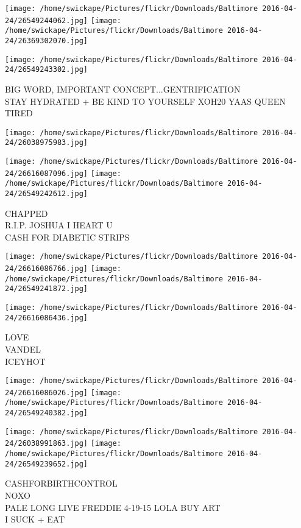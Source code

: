\documentclass[10pt,letterpaper]{article}
\begin{document}
\texttt{[image: /home/swickape/Pictures/flickr/Downloads/Baltimore 2016-04-24/26549244062.jpg]}
\texttt{[image: /home/swickape/Pictures/flickr/Downloads/Baltimore 2016-04-24/26369302070.jpg]}

\vspace{0.25in}
\texttt{[image: /home/swickape/Pictures/flickr/Downloads/Baltimore 2016-04-24/26549243302.jpg]}

BIG WORD, IMPORTANT CONCEPT...GENTRIFICATION\\
STAY HYDRATED + BE KIND TO YOURSELF XOH20 YAAS QUEEN\\
TIRED
\pagebreak

\texttt{[image: /home/swickape/Pictures/flickr/Downloads/Baltimore 2016-04-24/26038975983.jpg]}

\vspace{0.25in}
\texttt{[image: /home/swickape/Pictures/flickr/Downloads/Baltimore 2016-04-24/26616087096.jpg]}
\texttt{[image: /home/swickape/Pictures/flickr/Downloads/Baltimore 2016-04-24/26549242612.jpg]}

CHAPPED\\
R.I.P. JOSHUA I HEART U\\
CASH FOR DIABETIC STRIPS
\pagebreak

\texttt{[image: /home/swickape/Pictures/flickr/Downloads/Baltimore 2016-04-24/26616086766.jpg]}
\texttt{[image: /home/swickape/Pictures/flickr/Downloads/Baltimore 2016-04-24/26549241872.jpg]}

\vspace{0.25in}
\texttt{[image: /home/swickape/Pictures/flickr/Downloads/Baltimore 2016-04-24/26616086436.jpg]}

LOVE\\
VANDEL\\
ICEYHOT
\pagebreak

\texttt{[image: /home/swickape/Pictures/flickr/Downloads/Baltimore 2016-04-24/26616086026.jpg]}
\texttt{[image: /home/swickape/Pictures/flickr/Downloads/Baltimore 2016-04-24/26549240382.jpg]}

\texttt{[image: /home/swickape/Pictures/flickr/Downloads/Baltimore 2016-04-24/26038991863.jpg]}
\texttt{[image: /home/swickape/Pictures/flickr/Downloads/Baltimore 2016-04-24/26549239652.jpg]}

CASHFORBIRTHCONTROL\\
NOXO\\
PALE LONG LIVE FREDDIE 4{-}19{-}15 LOLA BUY ART\\
I SUCK + EAT
\pagebreak
\end{document}
